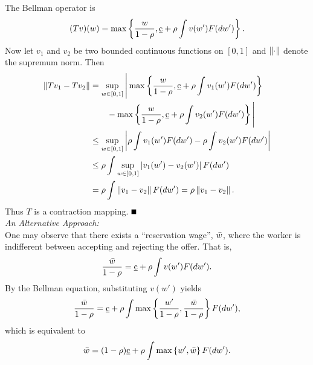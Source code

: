 \documentclass[12pt]{article}
\begin{document}
\begin{sol}[4.2]
    The Bellman operator is 
    \begin{equation*}
        (Tv)(w) = \max \left\{ {\frac{w}{1-\rho}, \underbar{c} + \rho \int v(w') F(dw')} \right\}.
    \end{equation*}
    Now let $v_1$ and $v_2$ be two bounded continuous functions on $[0,1]$ and 
    $\left\lVert {\cdot} \right\rVert$ denote the supremum norm. Then
    \begin{equation*}
        \begin{aligned}
            \left\lVert {Tv_1 - Tv_2} \right\rVert &= \sup_{w\in[0,1]}\Bigg\lvert\max\left\{ {\frac{w}{1-\rho}, \underbar{c} + \rho \int v_1(w') F(dw')} \right\}\\ 
            &\qquad- \max\left\{ {\frac{w}{1-\rho}, \underbar{c} + \rho \int v_2(w') F(dw')} \right\}\Bigg\rvert \\
            &\leq \sup_{w\in[0,1]}\left\lvert {\rho \int v_1(w') F(dw') - \rho \int v_2(w') F(dw')} \right\rvert\\ 
            &\leq \rho \int \sup_{w\in[0,1]}\left\lvert {v_1(w') - v_2(w')} \right\rvert F(dw')\\
            &= \rho \int \left\lVert {v_1 - v_2} \right\rVert F(dw') = \rho \left\lVert {v_1 - v_2} \right\rVert.
        \end{aligned}
    \end{equation*}
    Thus $T$ is a contraction mapping. \hfill\ensuremath{\myqedsymbol} \\
    \textit{An Alternative Approach:} \\
    One may observe that there exists a ``reservation wage'', $\Bar{w}$, 
    where the worker is indifferent between accepting and rejecting the 
    offer. That is,
    \begin{equation*}
        \frac{\Bar{w}}{1-\rho} = \underbar{c} + \rho \int v(w') F(dw').
    \end{equation*} 
    By the Bellman equation, substituting $v(w')$ yields
    \begin{equation*}
        \frac{\Bar{w}}{1-\rho} = \underbar{c} + \rho \int \max\left\{ {\frac{w'}{1-\rho}, \frac{\Bar{w}}{1-\rho}} \right\} F(dw'), 
    \end{equation*}
    which is equivalent to 
    \begin{equation*}
        \Bar{w} = (1-\rho)\underbar{c} + \rho \int \max\left\{ {w', \Bar{w}} \right\} F(dw').
    \end{equation*}
\end{sol}
\end{document}
